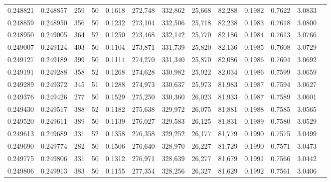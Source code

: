 \begin{tabular}{rrrrrrrrrrrrr}
0.248821 & 0.248857 &   259 &  50 &                                     0.1618 & 272,748 & 332,862 &  25,668 &  82,288 & 0.1982 & 0.7622 & 3.0833 \\
0.248859 & 0.248950 &   356 &  50 &                                     0.1232 & 273,104 & 332,506 &  25,718 &  82,238 & 0.1983 & 0.7618 & 3.0800 \\
0.248950 & 0.249005 &   364 &  52 &                                     0.1250 & 273,468 & 332,142 &  25,770 &  82,186 & 0.1984 & 0.7613 & 3.0766 \\
0.249007 & 0.249124 &   403 &  50 &                                     0.1104 & 273,871 & 331,739 &  25,820 &  82,136 & 0.1985 & 0.7608 & 3.0729 \\
0.249127 & 0.249189 &   399 &  50 &                                     0.1114 & 274,270 & 331,340 &  25,870 &  82,086 & 0.1986 & 0.7604 & 3.0692 \\
0.249191 & 0.249288 &   358 &  52 &                                     0.1268 & 274,628 & 330,982 &  25,922 &  82,034 & 0.1986 & 0.7599 & 3.0659 \\
0.249289 & 0.249372 &   345 &  51 &                                     0.1288 & 274,973 & 330,637 &  25,973 &  81,983 & 0.1987 & 0.7594 & 3.0627 \\
0.249376 & 0.249426 &   277 &  50 &                                     0.1529 & 275,250 & 330,360 &  26,023 &  81,933 & 0.1987 & 0.7589 & 3.0601 \\
0.249430 & 0.249517 &   388 &  52 &                                     0.1182 & 275,638 & 329,972 &  26,075 &  81,881 & 0.1988 & 0.7585 & 3.0565 \\
0.249520 & 0.249611 &   389 &  50 &                                     0.1139 & 276,027 & 329,583 &  26,125 &  81,831 & 0.1989 & 0.7580 & 3.0529 \\
0.249613 & 0.249689 &   331 &  52 &                                     0.1358 & 276,358 & 329,252 &  26,177 &  81,779 & 0.1990 & 0.7575 & 3.0499 \\
0.249690 & 0.249774 &   282 &  50 &                                     0.1506 & 276,640 & 328,970 &  26,227 &  81,729 & 0.1990 & 0.7571 & 3.0473 \\
0.249775 & 0.249806 &   331 &  50 &                                     0.1312 & 276,971 & 328,639 &  26,277 &  81,679 & 0.1991 & 0.7566 & 3.0442 \\
0.249806 & 0.249913 &   383 &  50 &                                     0.1155 & 277,354 & 328,256 &  26,327 &  81,629 & 0.1992 & 0.7561 & 3.0406 \\

\end{tabular}
